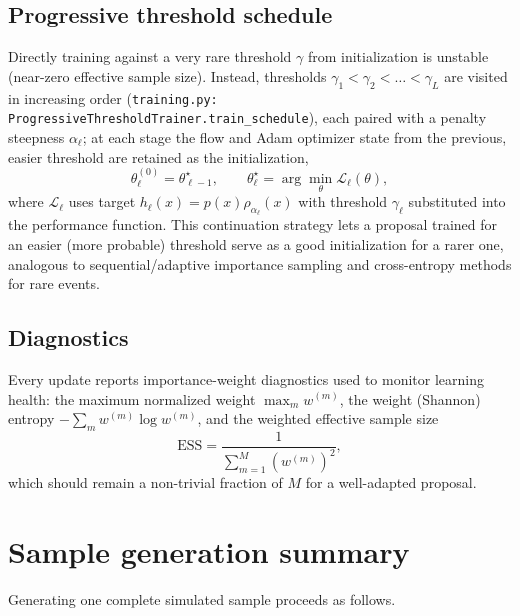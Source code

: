 \documentclass[11pt]{article}
\begin{document}
\subsection{Progressive threshold schedule}
\label{sec:progressive}

Directly training against a very rare threshold $\gamma$ from initialization
is unstable (near-zero effective sample size). Instead, thresholds
$\gamma_1 < \gamma_2 < \dots < \gamma_L$ are visited in increasing order
(\texttt{training.py: ProgressiveThresholdTrainer.train\_schedule}), each
paired with a penalty steepness $\alpha_\ell$; at each stage the flow and
Adam optimizer state from the previous, easier threshold are retained as the
initialization,
\begin{equation}
\theta_\ell^{(0)} = \theta_{\ell-1}^{\star},
\qquad
\theta_\ell^{\star} = \arg\min_\theta \mathcal L_\ell(\theta),
\end{equation}
where $\mathcal L_\ell$ uses target $h_\ell(x) = p(x)\rho_{\alpha_\ell}(x)$
with threshold $\gamma_\ell$ substituted into the performance function. This
continuation strategy lets a proposal trained for an easier (more probable)
threshold serve as a good initialization for a rarer one, analogous to
sequential/adaptive importance sampling and cross-entropy methods for rare
events.

\subsection{Diagnostics}

Every update reports importance-weight diagnostics used to monitor learning
health: the maximum normalized weight $\max_m w^{(m)}$, the weight (Shannon)
entropy $-\sum_m w^{(m)}\log w^{(m)}$, and the weighted effective sample size
\begin{equation}
\mathrm{ESS} = \frac{1}{\sum_{m=1}^M (w^{(m)})^2},
\end{equation}
which should remain a non-trivial fraction of $M$ for a well-adapted
proposal.

\section{Sample generation summary}

Generating one complete simulated sample proceeds as follows.
\end{document}
